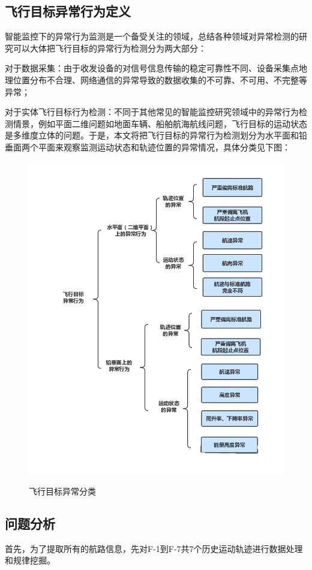 \documentclass[GBK]{ctexart}
\begin{document}
\begin{spacing}{1.5}
\subsection{飞行目标异常行为定义}
智能监控下的异常行为监测是一个备受关注的领域，总结各种领域对异常检测的研究可以大体把飞行目标的异常行为检测分为两大部分：

对于数据采集：由于收发设备的对信号信息传输的稳定可靠性不同、设备采集点地理位置分布不合理、网络通信的异常导致的数据收集的不可靠、不可用、不完整等异常；

对于实体飞行目标行为检测：不同于其他常见的智能监控研究领域中的异常行为检测情景，例如平面二维问题如地面车辆\cite{car}、船舶航海航线\cite{ship}问题，飞行目标的运动状态是多维度立体的问题。于是，本文将把飞行目标的异常行为检测划分为水平面和铅垂面两个平面来观察监测运动状态和轨迹位置的异常情况，具体分类见下图：
\begin{figure}[H]
  \centering
  \includegraphics[scale=0.85]{yi}\\%
  \caption{飞行目标异常分类}\label{yi}
\end{figure}
\subsection{问题分析}
首先，为了提取所有的航路信息，先对F-1到F-7共7个历史运动轨迹进行数据处理和规律挖掘。


\end{spacing}
\end{document}
